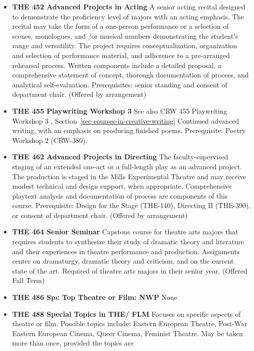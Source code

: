 \documentclass[
  letterpaper,
]{scrbook}
\begin{document}
\begin{itemize}
\item
  \textbf{THE 452 Advanced Projects in Acting} A senior acting recital
  designed to demonstrate the proficiency level of majors with an acting
  emphasis. The recital may take the form of a one-person performance or
  a selection of scenes, monologues, and /or musical numbers
  demonstrating the student's range and versatility. The project
  requires conceptualization, organization and selection of performance
  material, and adherence to a pre-arranged rehearsal process. Written
  components include a detailed proposal, a comprehensive statement of
  concept, thorough documentation of process, and analytical
  self-evaluation. Prerequisites: senior standing and consent of
  department chair. (Offered by arrangement)\\
\item
  \textbf{THE 455 Playwriting Workshop 3} See also CRW 455 Playwriting
  Workshop 3 , Section~\ref{sec-courses-in-creative-writing} Continued
  advanced writing, with an emphasis on producing finished poems.
  Prerequisite: Poetry Workshop 2 (CRW-380).
\item
  \textbf{THE 462 Advanced Projects in Directing} The faculty-supervised
  staging of an extended one-act or a full-length play as an advanced
  project. The production is staged in the Mills Experimental Theatre
  and may receive modest technical and design support, when appropriate.
  Comprehensive playtext analysis and documentation of process are
  components of this course. Prerequisite: Design for the Stage
  (THE-140), Directing II (THE-390), or consent of department chair.
  (Offered by arrangement)\\
\item
  \textbf{THE 464 Senior Seminar} Capstone course for theatre arts
  majors that requires students to synthesize their study of dramatic
  theory and literature and their experiences in theatre performance and
  production. Assignments center on dramaturgy, dramatic theory and
  criticism, and on the current state of the art. Required of theatre
  arts majors in their senior year. (Offered Fall Term)
\item
  \textbf{THE 486 Spc Top Theatre or Film: NWP} None\\
\item
  \textbf{THE 488 Special Topics in THE/ FLM} Focuses on specific
  aspects of theatre or film. Possible topics include: Eastern European
  Theatre, Post-War Eastern European Cinema, Queer Cinema, Feminist
  Theatre. May be taken more than once, provided the topics are

\end{itemize}
\end{document}
